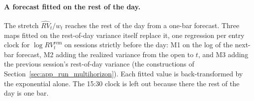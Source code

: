 \paragraph{A forecast fitted on the rest of the day.} The stretch
$\widehat{RV}_t/w_t$ reaches the rest of the day from a one-bar forecast. Three
maps fitted on the rest-of-day variance itself replace it, one regression per
entry clock for $\log RV^{\mathrm{rem}}_t$ on sessions strictly before the day:
M1 on the log of the next-bar forecast, M2 adding the realized variance from
the open to $t$, and M3 adding the previous session's rest-of-day variance
(the constructions of Section~\ref{sec:app_run_multihorizon}). Each fitted
value is back-transformed by the exponential alone. The 15:30 clock
is left out because there the rest of the day is one bar.

\begin{table}[H]
\centering
\caption{Rest-of-day signals on the eleven entry clocks 10:00--15:00
(\runappMapNbars{} trades, the \runappHcNdays{} days). QLIKE scores each
forecast against the realized variance from $t$ to the close.
$\mathrm{sign}(s^{\mathrm{rem}})$ trades $F^{\mathrm{rem}}_t-
\mathrm{IV}^2_{\mathrm{hr},t}h_t$ with the fitted map in place of the stretch.
$\Delta$Sharpe is the paired difference from the profile-stretch row at the
midpoint.}
\label{tab:app_run_maps}
\runappfit{\small}
\end{table}

